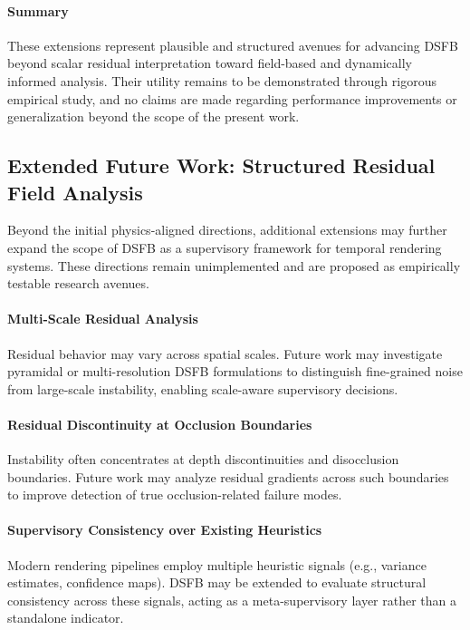 \documentclass[11pt,letterpaper]{article}
\theoremstyle{gcresult}
\theoremstyle{definition}
\begin{document}
\paragraph{Summary}
These extensions represent plausible and structured avenues for advancing DSFB beyond scalar residual interpretation toward field-based and dynamically informed analysis. Their utility remains to be demonstrated through rigorous empirical study, and no claims are made regarding performance improvements or generalization beyond the scope of the present work.

\subsection{Extended Future Work: Structured Residual Field Analysis}

Beyond the initial physics-aligned directions, additional extensions may further expand the scope of DSFB as a supervisory framework for temporal rendering systems. These directions remain unimplemented and are proposed as empirically testable research avenues.

\paragraph{Multi-Scale Residual Analysis}
Residual behavior may vary across spatial scales. Future work may investigate pyramidal or multi-resolution DSFB formulations to distinguish fine-grained noise from large-scale instability, enabling scale-aware supervisory decisions.

\paragraph{Residual Discontinuity at Occlusion Boundaries}
Instability often concentrates at depth discontinuities and disocclusion boundaries. Future work may analyze residual gradients across such boundaries to improve detection of true occlusion-related failure modes.

\paragraph{Supervisory Consistency over Existing Heuristics}
Modern rendering pipelines employ multiple heuristic signals (e.g., variance estimates, confidence maps). DSFB may be extended to evaluate structural consistency across these signals, acting as a meta-supervisory layer rather than a standalone indicator.
\end{document}

